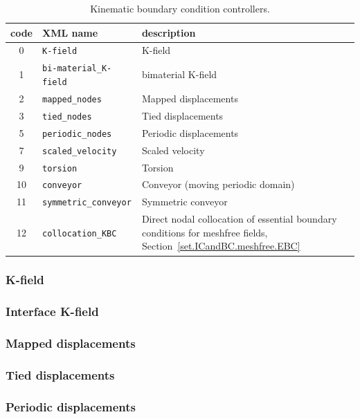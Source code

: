 \begin{table}[h]
\caption{\label{tab.KBC.controller.type} Kinematic boundary condition controllers.}
\begin{center}
{\small
\begin{tabular}[c]{|c|p{3.05in}|>{\raggedright\arraybackslash}p{2.45in}|}
\hline
\textbf{code} & \textbf{XML name} & \textbf{description}\\
\hline
0 & \texttt{K-field} & K-field\\
\hline
1 & \texttt{bi-material\_K-field} & bimaterial K-field\\
\hline
2 & \texttt{mapped\_nodes} & Mapped displacements\\
\hline
3 & \texttt{tied\_nodes} & Tied displacements\\
\hline
5 & \texttt{periodic\_nodes} & Periodic displacements\\
\hline
7 & \texttt{scaled\_velocity} & Scaled velocity\\
\hline
9 & \texttt{torsion} & Torsion\\
\hline
10 & \texttt{conveyor} & Conveyor (moving periodic domain)\\
\hline
11 & \texttt{symmetric\_conveyor} & Symmetric conveyor\\
\hline
12 & \texttt{collocation\_KBC} & Direct nodal collocation of essential boundary conditions for meshfree fields, Section~\ref{set.ICandBC.meshfree.EBC}\\
\hline
\end{tabular}}
\end{center}
\end{table}

\subsubsection{K-field}
\subsubsection{Interface K-field}
\subsubsection{Mapped displacements}
\subsubsection{Tied displacements}
\subsubsection{Periodic displacements}
